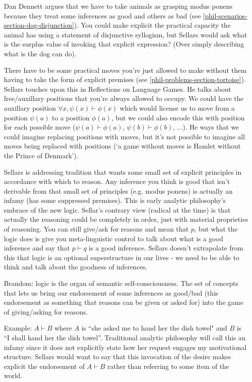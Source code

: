 \documentclass[12pt,a4paper]{report}
\begin{document}
Dan Dennett argues that we have to take animals as grasping modus ponens because they treat some inferences as good and others as bad (see \ref{phil-scenarios-section-dog-disjunction}). You could make explicit the practical capacity the animal has using a statement of disjunctive syllogism, but Sellars would ask what is the surplus value of invoking that explicit expression? (Over simply describing what is the dog can do).

There have to be some practical moves you're just allowed to make without them having to take the form of explicit premises (see \ref{phil-problems-section-tortoise}). Sellars touches upon this in Reflections on Language Games. He talks about free/auxillary positions that you're always allowed to occupy. We could have the auxillary position $\forall x, \psi(x)\vdash \phi(x)$ which would license us to move from a position $\psi(a)$ to a position $\phi(a)$, but we could also encode this with position for each possible move ($\psi(a)\vdash \phi(a)$, $\psi(b)\vdash\phi(b)$, ...). He ways that we could imagine replacing positions with moves, but it's not possible to imagine all moves being replaced with positions (`a game without moves is Hamlet without the Prince of Denmark').

Sellars is addressing tradition that wants some small set of explicit principles in accordance with which to reason. Any inference you think is good that isn't derivable from that small set of principles (e.g. modus ponens) is actually an infamy (has some suppressed premises). This is early analytic philosophy's embrace of the new logic. Sellar's contrary view (radical at the time) is that actually the reasoning could be completely in order, just with material proprieties of reasoning. You can still give/ask for reasons and mean that $p$, but what the logic does is give you meta-linguistic control to talk about what is a good inference and say that $p \vdash q$ is a good inference. Sellars doesn't extrapolate from this that logic is an optional superstructure in our lives - we need to be able to think and talk about the goodness of inferences.

Brandom: logic is the organ of semantic self-consciousness. The set of concepts that lets us bring our endorsement of some inferences as good/bad (this endorsement as something that reasons can be given or asked for) into the game of giving/asking for reasons.

Example: $A\vdash B$ where $A$ is ``she asked me to hand her the dish towel" and $B$ is ``I shall hand her the dish towel''. Traditional analytic philosophy will call this an infamy since it does not explicitly state how her request engages my motivational structure. Sellars would want to say that this invocation of the desire makes explicit the endorsement of $A \vdash B$ rather than referring to some item of the world.
\end{document}
